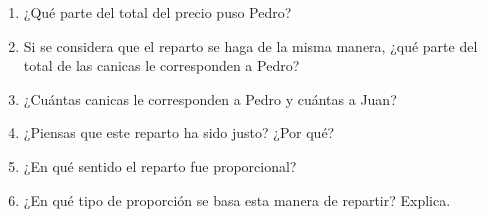 \documentclass[11pt]{book}
\begin{document}
\begin{enumerate}
        \begin{enumerate}
          \item ¿Qué parte del total del precio puso Pedro?
          \item Si se considera que el reparto se haga de la misma manera, ¿qué parte del total de las canicas le corresponden a Pedro?
          \item ¿Cuántas canicas le corresponden a Pedro y cuántas a Juan?
          \item ¿Piensas que este reparto ha sido justo? ¿Por qué?
          \item ¿En qué sentido el reparto fue proporcional?
          \item ¿En qué tipo de proporción se basa esta manera de repartir? Explica.
        \end{enumerate}




\end{enumerate}
\end{document}
